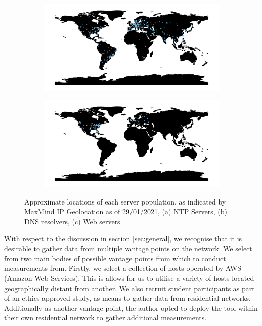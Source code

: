 \documentclass{l4proj}
\begin{document}
\begin{figure}[H]
     \centering
\begin{subfigure}{.5\textwidth}
  \centering
  \includegraphics[width=\linewidth]{dissertation/images/dns.locs.map.pdf}
  \caption{}
  \label{fig:sub1}
\end{subfigure}%
\begin{subfigure}{.5\textwidth}
  \centering
  \includegraphics[width=\linewidth]{dissertation/images/web.locs.map.pdf}
  \caption{}
  \label{fig:sub2}
\end{subfigure}
\caption{Approximate locations of each server population, as indicated by MaxMind IP Geolocation as of 29/01/2021, (a) NTP Servers, (b) DNS resolvers, (c) Web servers}
\label{fig:locs}
  
\end{figure}

With respect to the discussion in section \ref{sec:general}, we recognise that it is desirable to gather data from multiple vantage points on the network. We select from two main bodies of possible vantage points from which to conduct measurements from. Firstly, we select a collection of hosts operated by AWS (Amazon Web Services). This is allows for us to utilise a variety of hosts located geographically distant from another. We also recruit student participants as part of an ethics approved study, as means to gather data from residential networks. Additionally as another vantage point, the author opted to deploy the tool within their own residential network to gather additional measurements.
\end{document}
